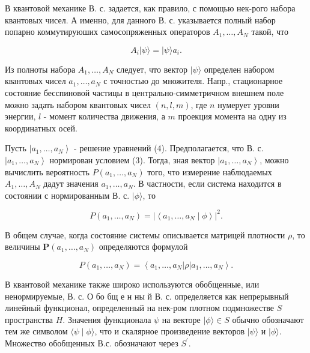 \documentclass[10pt]{article}
\begin{document}
В квантовой механике В. с. задается, как правило, с помощью нек-рого набора квантовых чисел. А именно, для данного В. с. указывается полный набор попарно коммутируюших самосопряженных операторов $A_{1}, \ldots, A_{N}$ такой, что



\[

A_{i}|\psi\rangle=|\psi\rangle a_{i} .

\]



Из полноты набора $A_{1}, \ldots, A_{N}$ следует, что вектор $|\psi\rangle$ определен набором квантовых чисел $a_{1}, \ldots, a_{N}$ с точностью до множителя. Напр., стационарное состояние бесспиновой частицы в центрально-симметричном внешнем поле можно задать набором квантовых чисел $(n, l, m)$, где $n$ нумерует уровни энергии, $l$ - момент количества движения, а $m$ проекция момента на одну из координатных осей.



Пусть $\left|a_{1}, \ldots, a_{N}\right\rangle$ - решение уравнений (4). Предполагается, что В. с. $\left|a_{1}, \ldots, a_{N}\right\rangle$ нормирован условием (3). Тогда, зная вектор $\left|a_{1}, \ldots, a_{N}\right\rangle$, можно вычислить вероятность $P\left(a_{1}, \ldots, a_{N}\right)$ того, что измерение наблюдаемых $A_{1}, \ldots, A_{N}$ дадут значения $a_{1}, \ldots, a_{N}$. В частности, если система находится в состоянии с нормированным В. с. $|\phi\rangle$, то



\[

P\left(a_{1}, \ldots, a_{N}\right)=\left|\left\langle a_{1}, \ldots, a_{N} \mid \phi\right\rangle\right|^{2} .

\]



В общем случае, когда состояние системы описывается матрицей плотности $\rho$, то величины $\boldsymbol{P}\left(a_{1}, \ldots, a_{N}\right)$ определяются формулой



\[

P\left(a_{1}, \ldots, a_{N}\right)=\left\langle a_{1}, \ldots, a_{N}|\rho| a_{1}, \ldots, a_{N}\right\rangle .

\]



В квантовой механике также широко используются обобщенные, или ненормируемые, В. с. О бо бщ е н ны й В. с. определяется как непрерывный линейный функционал, определенный на нек-ром плотном подмножестве $S$ пространства $H$. Значения функционала $\psi$ на векторе $|\phi\rangle \in S$ обычно обозначают тем же символом $\langle\psi \mid \phi\rangle$, что и скалярное произведение векторов $|\psi\rangle$ и $|\phi\rangle$. Множество обобщенных В.с. обозначают через $S^{\prime}$.
\end{document}
